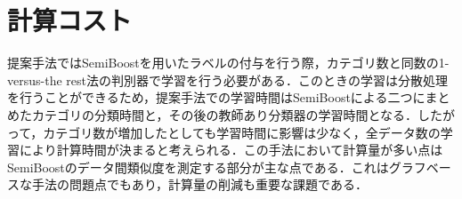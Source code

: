 \section{計算コスト}
提案手法ではSemiBoostを用いたラベルの付与を行う際，カテゴリ数と同数の1-versus-the rest法の判別器で学習を行う必要がある．このときの学習は分散処理を行うことができるため，提案手法での学習時間はSemiBoostによる二つにまとめたカテゴリの分類時間と，その後の教師あり分類器の学習時間となる．したがって，カテゴリ数が増加したとしても学習時間に影響は少なく，全データ数の学習により計算時間が決まると考えられる．この手法において計算量が多い点はSemiBoostのデータ間類似度を測定する部分が主な点である．これはグラフベースな手法の問題点でもあり，計算量の削減も重要な課題である．

